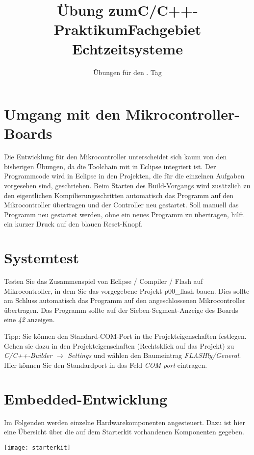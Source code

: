 \documentclass[
  accentcolor=tud1c,	%
  colorbacktitle,		%
  inverttitle,			%
  german,				%
  twoside
]{tudexercise}
\title{Übung zum\linebreak[1]C/C++-Praktikum\linebreak[1] Fachgebiet Echtzeitsysteme}
\subtitle{Übungen für den \tag{}. Tag}
\newcommand{\tag}{5}
\begin{document}
\begin{examheader}
	\textmb{Übung zum C/C++-Praktikum - Tag \tag{}}
\end{examheader}
\maketitle 


\section{Umgang mit den Mikrocontroller-Boards}

Die Entwicklung für den Mikrocontroller unterscheidet sich kaum von den bisherigen Übungen, da die Toolchain mit in Eclipse integriert ist. Der Programmcode wird in Eclipse in den Projekten, die für die einzelnen Aufgaben vorgesehen sind, geschrieben. Beim Starten des Build-Vorgangs wird zusätzlich zu den eigentlichen Kompilierungsschritten automatisch das Programm auf den Mikrocontroller übertragen und der Controller neu gestartet. Soll manuell das Programm neu gestartet werden, ohne ein neues Programm zu übertragen, hilft ein kurzer Druck auf den blauen Reset-Knopf.


\section{Systemtest}

Testen Sie das Zusammenspiel von Eclipse / Compiler / Flash auf Mikrocontroller, in dem Sie das vorgegebene Projekt p00\_flash bauen.
Dies sollte am Schluss automatisch das Programm auf den angeschlossenen Mikrocontroller übertragen.
Das Programm sollte auf der Sieben-Segment-Anzeige des Boards eine \textit{42} anzeigen.

Tipp:
Sie können den Standard-COM-Port in the Projekteigenschaften festlegen.
Gehen sie dazu in den Projekteigenschaften (Rechtsklick auf das Projekt) zu \emph{C/C++-Builder $\to$ Settings} und wählen den Baumeintrag \emph{FLASHly/General}.
Hier können Sie den Standardport in das Feld \emph{COM port} eintragen.

\section{Embedded-Entwicklung}

Im Folgenden werden einzelne Hardwarekomponenten angesteuert. Dazu ist hier eine Übersicht über die auf dem Starterkit vorhandenen Komponenten gegeben.
\begin{center}\texttt{[image: starterkit]}\end{center}
\end{document}
